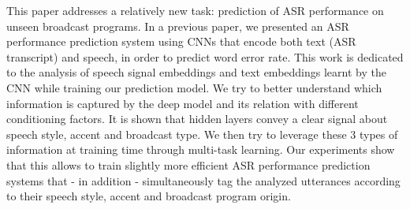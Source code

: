 This paper addresses a relatively new task: prediction of  ASR performance on unseen broadcast programs. In a previous paper, we presented an ASR performance prediction system using CNNs that encode both text (ASR transcript) and speech, in order to predict word error rate. This work is  dedicated to the analysis of speech signal embeddings and text embeddings learnt by the CNN while training  our prediction model. We try to better understand which information is captured by the deep model and its relation with different conditioning factors. It is shown that hidden layers convey a clear signal about speech style, accent and broadcast type. We then try to leverage these 3 types of information at training time through multi-task learning. Our experiments show that this allows to train slightly more efficient ASR performance prediction systems that - in addition - simultaneously tag the analyzed utterances according to their speech style, accent and broadcast program origin.
